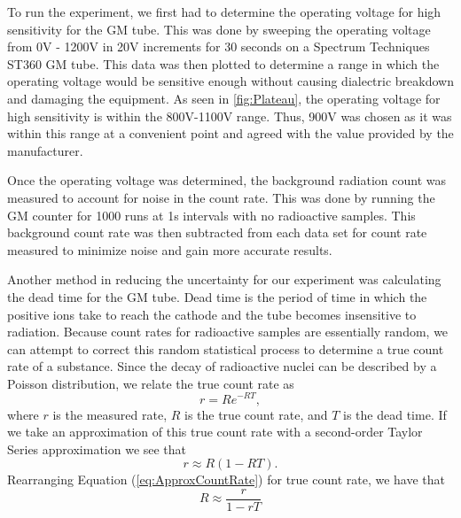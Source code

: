 
\par \indent To run the experiment, we first had to determine the operating voltage for high sensitivity for the GM tube. This was done by sweeping the operating voltage from 0V - 1200V in 20V increments for 30 seconds on a Spectrum Techniques ST360 GM tube. This data was then plotted to determine a range in which the operating voltage would be sensitive enough without causing dialectric breakdown and damaging the equipment. As seen in \ref{fig:Plateau}, the operating voltage for high sensitivity is within the 800V-1100V range. Thus, 900V was chosen as it was within this range at a convenient point and agreed with the value provided by the manufacturer.

\par Once the operating voltage was determined, the background radiation count was measured to account for noise in the count rate. This was done by running the GM counter for 1000 runs at 1s intervals with no radioactive samples. This background count rate was then subtracted from each data set for count rate measured to minimize noise and gain more accurate results.

\par Another method in reducing the uncertainty for our experiment was calculating the dead time for the GM tube. Dead time is the period of time in which the positive ions take to reach the cathode and the tube becomes insensitive to radiation. Because count rates for radioactive samples are essentially random, we can attempt to correct this random statistical process to determine a true count rate of a substance.  Since the decay of radioactive nuclei can be described by a Poisson distribution, we relate the true count rate as\cite{Spectrum}
\begin{equation}
r = Re^{-RT}, 
\label{eq:ActualCountRate}
\end{equation}
where $r$ is the measured rate, $R$ is the true count rate, and $T$ is the dead time. If we take an approximation of this true count rate with a second-order Taylor Series approximation we see that
\begin{equation}
r \approx R(1-RT).
\label{eq:ApproxCountRate}
\end{equation}
Rearranging Equation (\ref{eq:ApproxCountRate}) for true count rate, we have that
\begin{equation}
R \approx \frac{r}{1-rT}
\label{eq:TrueCountRate}
\end{equation}


